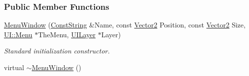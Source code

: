 \subsubsection*{Public Member Functions}
\begin{DoxyCompactItemize}
\item 
\hyperlink{classphys_1_1UI_1_1MenuWindow_a8d62e0cdbb3e8073c62b67c3e0b4dfda}{MenuWindow} (\hyperlink{namespacephys_a5ce5049f8b4bf88d6413c47b504ebb31}{ConstString} \&Name, const \hyperlink{classphys_1_1Vector2}{Vector2} Position, const \hyperlink{classphys_1_1Vector2}{Vector2} Size, \hyperlink{classphys_1_1UI_1_1Menu}{UI::Menu} $\ast$TheMenu, \hyperlink{classphys_1_1UILayer}{UILayer} $\ast$Layer)
\begin{DoxyCompactList}\small\item\em Standard initialization constructor. \item\end{DoxyCompactList}\item 
\hypertarget{classphys_1_1UI_1_1MenuWindow_a8de1eab7a7897e24dfb722cce7d903eb}{
virtual \hyperlink{classphys_1_1UI_1_1MenuWindow_a8de1eab7a7897e24dfb722cce7d903eb}{$\sim$MenuWindow} ()}
\label{d4/d07/classphys_1_1UI_1_1MenuWindow_a8de1eab7a7897e24dfb722cce7d903eb}


\end{DoxyCompactItemize}
